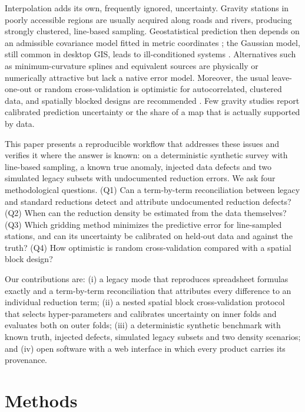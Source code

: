 \documentclass[11pt,a4paper]{article}
\begin{document}
Interpolation adds its own, frequently ignored, uncertainty. Gravity stations in poorly accessible regions are usually acquired along roads and rivers, producing strongly clustered, line-based sampling. Geostatistical prediction then depends on an admissible covariance model fitted in metric coordinates \citep{Cressie1985,ChilesDelfiner2012}; the Gaussian model, still common in desktop GIS, leads to ill-conditioned systems \citep{Stein1999}. Alternatives such as minimum-curvature splines \citep{Briggs1974,SmithWessel1990,Uieda2018} and equivalent sources \citep{Dampney1969,Cordell1992,SolerUieda2021} are physically or numerically attractive but lack a native error model. Moreover, the usual leave-one-out or random cross-validation is optimistic for autocorrelated, clustered data, and spatially blocked designs are recommended \citep{Roberts2017}. Few gravity studies report calibrated prediction uncertainty or the share of a map that is actually supported by data.

This paper presents a reproducible workflow that addresses these issues and verifies it where the answer is known: on a deterministic synthetic survey with line-based sampling, a known true anomaly, injected data defects and two simulated legacy subsets with undocumented reduction errors. We ask four methodological questions. (Q1) Can a term-by-term reconciliation between legacy and standard reductions detect and attribute undocumented reduction defects? (Q2) When can the reduction density be estimated from the data themselves? (Q3) Which gridding method minimizes the predictive error for line-sampled stations, and can its uncertainty be calibrated on held-out data and against the truth? (Q4) How optimistic is random cross-validation compared with a spatial block design?

Our contributions are: (i) a legacy mode that reproduces spreadsheet formulas exactly and a term-by-term reconciliation that attributes every difference to an individual reduction term; (ii) a nested spatial block cross-validation protocol that selects hyper-parameters and calibrates uncertainty on inner folds and evaluates both on outer folds; (iii) a deterministic synthetic benchmark with known truth, injected defects, simulated legacy subsets and two density scenarios; and (iv) open software with a web interface in which every product carries its provenance.

\section{Methods}
\end{document}
